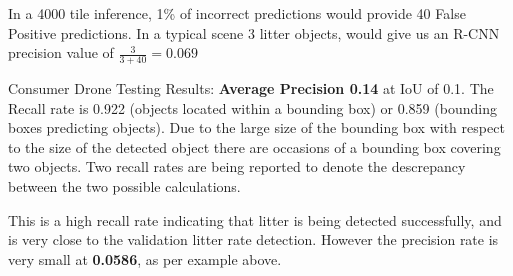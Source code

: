 \documentclass{article}
\begin{document}
In a 4000 tile inference, 1\% of incorrect predictions would provide 40 False Positive predictions. In a typical scene 3 litter objects, would give us an R-CNN precision value of $\frac{3}{3+40} = 0.069$


Consumer Drone Testing Results: \textbf{Average Precision 0.14} at IoU of 0.1. The Recall rate is 0.922 (objects located within a bounding box) or 0.859 (bounding boxes predicting objects). Due to the large size of the bounding box with respect to the size of the detected object there are occasions of a bounding box covering two objects. Two recall rates are being reported to denote the descrepancy between the two possible calculations.\newline

This is a high recall rate indicating that litter is being detected successfully, and is very close to the validation litter rate detection.  However the precision rate is very small at \textbf{0.0586}, as per example above. 
\end{document}
